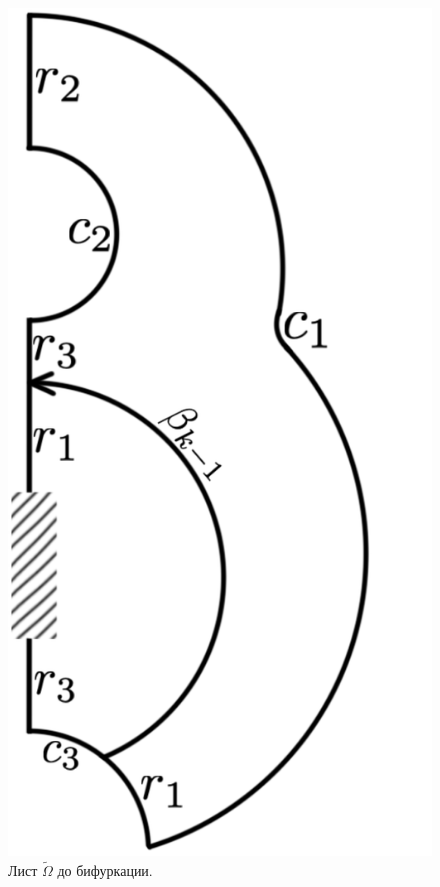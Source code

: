 \begin{figure}[!htb]
\includegraphics[scale=0.12]{images/ch4/section3_circular/atoms/III/page_segment_2.pdf}
    \caption{Лист $\widetilde{\Omega}$ до бифуркации.}
        \label{fig:pt10:_III_page_segment_2}
\endminipage\hfill
\end{figure}

